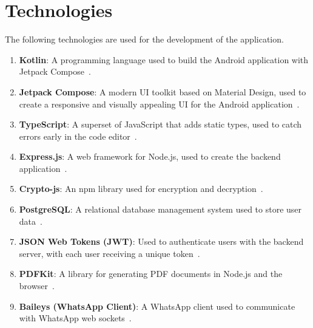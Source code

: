 \section{Technologies}\label{sec:technologies}
\justify

The following technologies are used for the development of the application.

\begin{enumerate}[label=\roman*.]
  \item \textbf{Kotlin}: A programming language used to build the Android application with Jetpack Compose~\cite{kt}.
  \item \textbf{Jetpack Compose}: A modern UI toolkit based on Material Design, used to create a responsive and visually appealing UI for the Android application~\cite{kt}.
  \item \textbf{TypeScript}: A superset of JavaScript that adds static types, used to catch errors early in the code editor~\cite{TypeScript}.
  \item \textbf{Express.js}: A web framework for Node.js, used to create the backend application~\cite{Express}.
  \item \textbf{Crypto-js}: An npm library used for encryption and decryption~\cite{Crypto-js}.
  \item \textbf{PostgreSQL}: A relational database management system used to store user data~\cite{psql}.
  \item \textbf{JSON Web Tokens (JWT)}: Used to authenticate users with the backend server, with each user receiving a unique token~\cite{JWT}.
  \item \textbf{PDFKit}: A library for generating PDF documents in Node.js and the browser~\cite{PDFKit}.
  \item \textbf{Baileys (WhatsApp Client)}: A WhatsApp client used to communicate with WhatsApp web sockets~\cite{Baileys}.
\end{enumerate}
